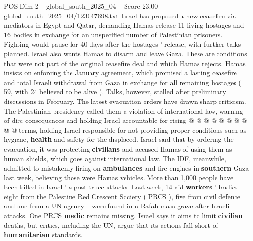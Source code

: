 \begin{textsample}{POS Dim 2 – global\_south\_2025\_04 – Score 23.00 – global\_south\_2025\_04/123047698.txt}
Israel has proposed a new ceasefire via mediators in Egypt and Qatar, demanding Hamas release 11 living hostages and 16 bodies in exchange for an unspecified number of Palestinian prisoners.
Fighting would pause for 40 days after the hostages ' release, with further talks planned.
Israel also wants Hamas to disarm and leave Gaza.
These are conditions that were not part of the original ceasefire deal and which Hamas rejects.
Hamas insists on enforcing the January agreement, which promised a lasting ceasefire and total Israeli withdrawal from Gaza in exchange for all remaining hostages ( 59, with 24 believed to be alive ).
Talks, however, stalled after preliminary discussions in February.
The latest evacuation orders have drawn sharp criticism.
The Palestinian presidency called them a violation of international law, warning of dire consequences and holding Israel accountable for rising @ @ @ @ @ @ @ @ @ @ terms, holding Israel responsible for not providing proper conditions such as hygiene, \textbf{health} and safety for the displaced.
Israel said that by ordering the evacuation, it was protecting \textbf{civilians} and accused Hamas of using them as human shields, which goes against international law.
The IDF, meanwhile, admitted to mistakenly firing on \textbf{ambulances} and fire engines in \textbf{southern} Gaza last week, believing those were Hamas vehicles.
More than 1,000 people have been killed in Israel ' s post-truce attacks.
Last week, 14 aid \textbf{workers} ' bodies -- eight from the Palestine Red Crescent Society ( PRCS ), five from civil defence and one from a UN agency -- were found in a Rafah mass grave after Israeli attacks.
One PRCS \textbf{medic} remains missing.
Israel says it aims to limit \textbf{civilian} deaths, but critics, including the UN, argue that its actions fall short of \textbf{humanitarian} standards.

\end{textsample}
